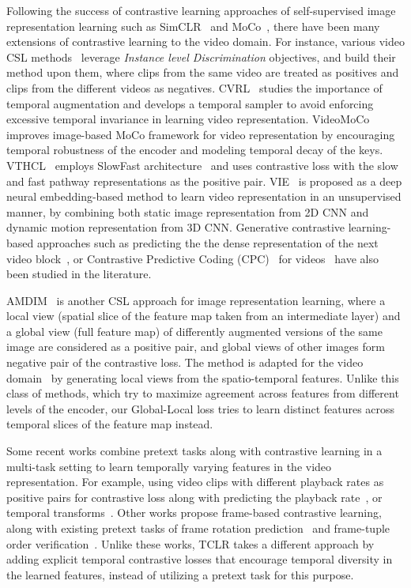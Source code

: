 \documentclass[10pt,twocolumn,letterpaper]{article}
\begin{document}
  Following the success of contrastive learning approaches of self-supervised image representation learning such as SimCLR~\cite{simclr} and MoCo~\cite{moco}, there have been many extensions of contrastive learning to the video domain. For instance, various video CSL methods~\cite{pace_pred,videomoco, taco, cvrl, iic, seco,idt, iclr21submitted_st_invariant,vtc} leverage \textit{Instance level Discrimination} objectives, and build their method upon them, where clips from the same video are treated as positives and clips from the different videos as negatives. CVRL~\cite{cvrl} studies the importance of temporal augmentation and develops a temporal sampler to avoid enforcing excessive temporal invariance in learning video representation. VideoMoCo~\cite{videomoco} improves image-based MoCo framework for video representation by encouraging temporal robustness of the encoder and modeling temporal decay of the keys. VTHCL~\cite{vtc} employs SlowFast architecture~\cite{slowfast} and uses contrastive loss with the slow and fast pathway representations as the positive pair. VIE~\cite{vie} is proposed as a deep neural embedding-based method to learn video representation in an unsupervised manner, by combining both static image representation from 2D CNN and dynamic motion representation from 3D CNN. Generative contrastive learning-based approaches such as predicting the the dense representation of the next video block~\cite{dpc, memdpc}, or Contrastive Predictive Coding (CPC)~\cite{cpc} for videos~\cite{wacv20} have also been studied in the literature. 

AMDIM~\cite{amdim} is another CSL approach for image representation learning, where a local view (spatial slice of the feature map taken from an intermediate layer) and a global view (full feature map) of differently augmented versions of the same image are considered as a positive pair, and global views of other images form negative pair of the contrastive loss. The method is adapted for the video domain~\cite{vdim,dvim} by generating local views from the spatio-temporal features. Unlike this class of methods, which try to maximize agreement across features from different levels of the encoder, our Global-Local loss tries to learn distinct features across temporal slices of the feature map instead. 

Some recent works combine pretext tasks along with contrastive learning in a multi-task setting to learn temporally varying features in the video representation. For example, using video clips with different playback rates as positive pairs for contrastive loss along with predicting the playback rate~\cite{pace_pred}, or temporal transforms~\cite{taco}. Other works propose frame-based contrastive learning, along with existing pretext tasks of frame rotation prediction~\cite{tce} and frame-tuple order verification~\cite{seco}. Unlike these works, TCLR takes a different approach by adding explicit temporal contrastive losses that encourage temporal diversity in the learned features, instead of utilizing a pretext task for this purpose. 
\end{document}
